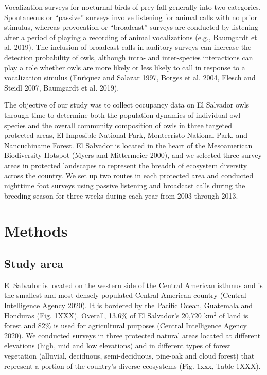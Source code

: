 \documentclass[
]{article}
\begin{document}
Vocalization surveys for nocturnal birds of prey fall generally into two
categories. Spontaneous or ``passive'' surveys involve listening for
animal calls with no prior stimulus, whereas provocation or
``broadcast'' surveys are conducted by listening after a period of
playing a recording of animal vocalizations (e.g., Baumgardt et al.
2019). The inclusion of broadcast calls in auditory surveys can increase
the detection probability of owls, although intra- and inter-species
interactions can play a role whether owls are more likely or less likely
to call in response to a vocalization simulus (Enrı́quez and Salazar
1997, Borges et al. 2004, Flesch and Steidl 2007, Baumgardt et al.
2019).

The objective of our study was to collect occupancy data on El Salvador
owls through time to determine both the population dynamics of
individual owl species and the overall community composition of owls in
three targeted protected areas, El Imposible National Park, Montecristo
National Park, and Nancuchiname Forest. El Salvador is located in the
heart of the Mesoamerican Biodiversity Hotspot (Myers and Mittermeier
2000), and we selected three survey areas in protected landscapes to
represent the breadth of ecosystem diversity across the country. We set
up two routes in each protected area and conducted nighttime foot
surveys using passive listening and broadcast calls during the breeding
season for three weeks during each year from 2003 through 2013.

\hypertarget{methods}{%
\section{Methods}\label{methods}}

\hypertarget{study-area}{%
\subsection{Study area}\label{study-area}}

El Salvador is located on the western side of the Central American
isthmus and is the smallest and most densely populated Central American
country (Central Intelligence Agency 2020). It is bordered by the
Pacific Ocean, Guatemala and Honduras (Fig. 1XXX). Overall, 13.6\% of El
Salvador's 20,720 km\(^2\) of land is forest and 82\% is used for
agricultural purposes (Central Intelligence Agency 2020). We conducted
surveys in three protected natural areas located at different elevations
(high, mid and low elevations) and in different types of forest
vegetation (alluvial, deciduous, semi-deciduous, pine-oak and cloud
forest) that represent a portion of the country's diverse ecosystems
(Fig. 1xxx, Table 1XXX).
\end{document}
